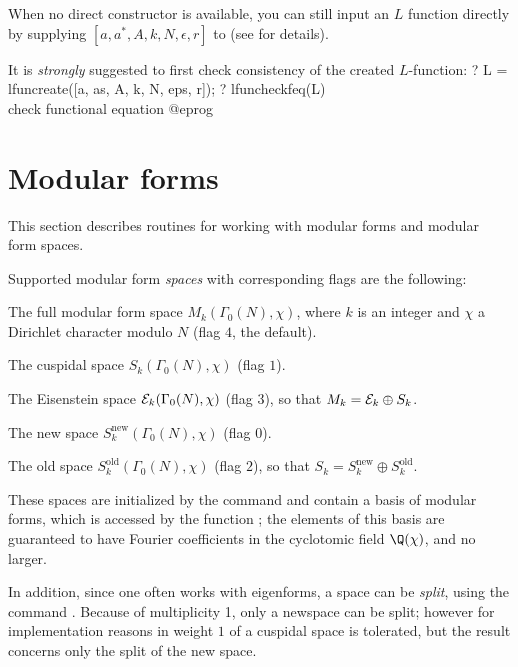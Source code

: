 When no direct constructor is available, you can still input an $L$ function
directly by supplying $[a, a^*,A, k, N, \epsilon, r]$ to 
(see  for details).

It is \emph{strongly} suggested to first check consistency of the created
$L$-function:
\bprog
? L = lfuncreate([a, as, A, k, N, eps, r]);
? lfuncheckfeq(L)  \\ check functional equation
@eprog


\section{Modular forms}

This section describes routines for working with modular forms and modular
form spaces.


Supported modular form \emph{spaces} with corresponding flags are the
following:

\item The full modular form space $M_k(\Gamma_0(N),\chi)$, where $k$ is an
integer and $\chi$ a Dirichlet character modulo $N$ (flag $4$, the default).

\item The cuspidal space $S_k(\Gamma_0(N),\chi)$ (flag $1$).

\item The Eisenstein space ${\cal E}_k(\Gamma_0(N),\chi)$ (flag $3$), so
that $M_k={\cal E}_k\oplus S_k$.

\item The new space $S_k^{\text{new}}(\Gamma_0(N),\chi)$ (flag $0$).

\item The old space $S_k^{\text{old}}(\Gamma_0(N),\chi)$ (flag $2$), so that
$S_k=S_k^{\text{new}}\oplus S_k^{\text{old}}$.

These spaces are initialized by the  command and contain a basis of
modular forms, which is accessed by the function ; the elements of
this basis are guaranteed to have Fourier coefficients in the cyclotomic field
$\Q(\chi)$, and no larger.

In addition, since one often works with eigenforms, a space can be
\emph{split}, using the command . Because of multiplicity 1,
only a newspace can be split; however for implementation reasons in weight $1$
 of a cuspidal space is tolerated, but the result concerns
only the split of the new space.

